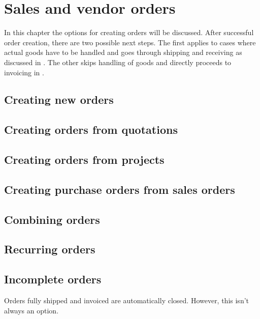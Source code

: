 \chapter{Sales and vendor orders}
\label{cha:OrderManagement}

In this chapter the options for creating orders will be discussed.
After successful order creation, there are two possible next steps.
The first applies to cases where actual goods have to be handled
and goes through shipping and receiving as discussed in
. The other skips handling of goods
and directly proceeds to invoicing in .

\section{Creating new orders}

\section{Creating orders from quotations}
\label{sec:QuotationsFromOrders}

\section{Creating orders from projects}

\section{Creating purchase orders from sales orders}

\section{Combining orders}

\section{Recurring orders}
\label{sec:RecurringOrders}


\section{Incomplete orders}

Orders fully shipped and invoiced are automatically closed. However, this isn't always an option.

